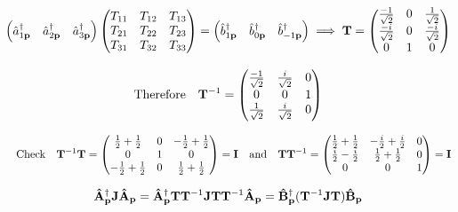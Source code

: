 \documentclass{article}
\begin{document}
\[\begin{pmatrix}
    \hat{a}^\dagger_{1\vb{p}} &
    \hat{a}^\dagger_{2\vb{p}} &
    \hat{a}^\dagger_{3\vb{p}}
  \end{pmatrix}\begin{pmatrix}
    T_{11} & T_{12} & T_{13} \\
    T_{21} & T_{22} & T_{23} \\
    T_{31} & T_{32} & T_{33} \\
  \end{pmatrix}=\begin{pmatrix}
    \hat{b}^\dagger_{1\vb{p}} &
    \hat{b}^\dagger_{0\vb{p}} &
    \hat{b}^\dagger_{-1\vb{p}}
  \end{pmatrix}\implies\vb{T}=\begin{pmatrix}
    \frac{-1}{\sqrt{2}} & 0 & \frac{1}{\sqrt{2}}  \\
    \frac{-i}{\sqrt{2}} & 0 & \frac{-i}{\sqrt{2}} \\
    0                   & 1 & 0                   \\
  \end{pmatrix}\]

\[\qq*{Therefore}\vb{T}^{-1}=\begin{pmatrix}
    \frac{-1}{\sqrt{2}} & \frac{i}{\sqrt{2}} & 0 \\
    0                   & 0                  & 1 \\
    \frac{1}{\sqrt{2}}  & \frac{i}{\sqrt{2}} & 0 \\
  \end{pmatrix}\]

\[\qq{Check}\vb{T}^{-1}\vb{T}=\begin{pmatrix}
    \frac{1}{2}+\frac{1}{2}  & 0 & -\frac{1}{2}+\frac{1}{2} \\
    0                        & 1 & 0                        \\
    -\frac{1}{2}+\frac{1}{2} & 0 & \frac{1}{2}+\frac{1}{2}  \\
  \end{pmatrix}=\vb{I}\qand\vb{T}\vb{T}^{-1}=\begin{pmatrix}
    \frac{1}{2}+\frac{1}{2} & -\frac{i}{2}+\frac{i}{2} & 0 \\
    \frac{i}{2}-\frac{i}{2} & \frac{1}{2}+\frac{1}{2}  & 0 \\
    0                       & 0                        & 1 \\
  \end{pmatrix}=\vb{I}\]


\[\vb{\hat{A}}^\dagger_{\vb{p}}\vb{J}\vb{\hat{A}}_{\vb{p}}=\vb{\hat{A}}^\dagger_{\vb{p}}\vb{T}\vb{T}^{-1}\vb{J}\vb{T}\vb{T}^{-1}\vb{\hat{A}}_{\vb{p}}=\vb{\hat{B}}^\dagger_{\vb{p}}(\vb{T}^{-1}\vb{J}\vb{T})\vb{\hat{B}}_{\vb{p}}\]
\end{document}
